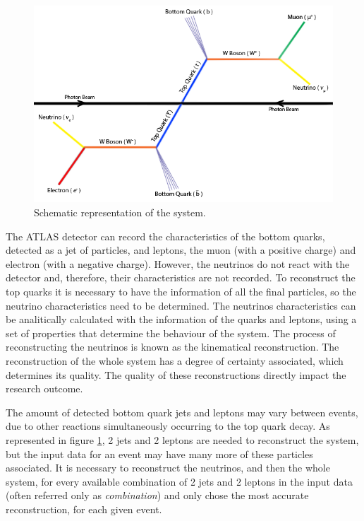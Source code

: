 \begin{figure}[!htp]
	\begin{center}
		\includegraphics[scale=0.6]{../../common/img/ttbar.png}
		\caption{Schematic representation of the \ttbar system.}
		\label{fig:TopQuarkDecay}
	\end{center}
\end{figure}

The ATLAS detector can record the characteristics of the bottom quarks, detected as a jet of particles, and leptons, the muon (with a positive charge) and electron (with a negative charge). However, the neutrinos do not react with the detector and, therefore, their characteristics are not recorded. To reconstruct the top quarks it is necessary to have the information of all the final particles, so the neutrino characteristics need to be determined. The neutrinos characteristics can be analitically calculated with the information of the quarks and leptons, using a set of properties that determine the behaviour of the \ttbar system. The process of reconstructing the neutrinos is known as the kinematical reconstruction. The reconstruction of the whole \ttbar system has a degree of certainty associated, which determines its quality. The quality of these reconstructions directly impact the research outcome.

The amount of detected bottom quark jets and leptons may vary between events, due to other reactions simultaneously occurring to the top quark decay. As represented in figure \ref{fig:TopQuarkDecay}, 2 jets and 2 leptons are needed to reconstruct the \ttbar system, but the input data for an event may have many more of these particles associated. It is necessary to reconstruct the neutrinos, and then the whole system, for every available combination of 2 jets and 2 leptons in the input data (often referred only as \textit{combination}) and only chose the most accurate reconstruction, for each given event.

